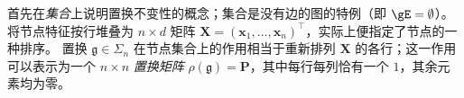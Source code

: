


首先在\emph{集合}上说明置换不变性的概念；集合是没有边的图的特例（即 $\gE=\emptyset$）。
%
将节点特征按行堆叠为 $n\times d$ 矩阵
 $\mathbf{X} = (\mathbf{x}_1, \hdots, \mathbf{x}_n)^\top$，实际上便指定了节点的一种排序。
置换 $\mathfrak{g}\in\Sigma_n$ 在节点集合上的作用相当于重新排列 $\mathbf{X}$ 的各行；这一作用可以表示为一个 $n\times n$ {\em 置换矩阵} $\rho(\mathfrak{g}) = \mathbf{P}$，其中每行每列恰有一个 $1$，其余元素均为零。



 
 

